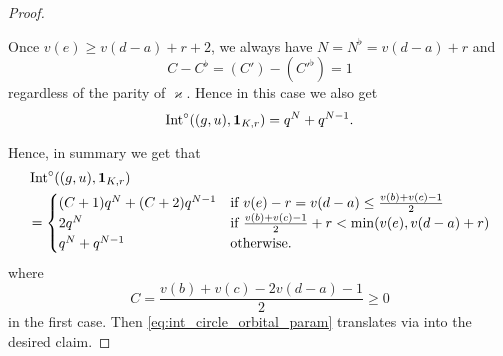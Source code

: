 \begin{proof}
\begin{itemize}
\begin{itemize}
      \ii Once $v(e) \ge v(d-a) + r + 2$,
      we always have $N = N^\flat = v(d-a) + r$ and
      \[ C - C^\flat = (C') - (C'^\flat) = 1 \]
      regardless of the parity of $\varkappa$.
      Hence in this case we also get
      \[ \operatorname{Int}^\circ((g,u), \mathbf{1}_{K, r}) = q^{N} + q^{N-1}. \]
    \end{itemize}
  \end{itemize}
  Hence, in summary we get that
  \begin{equation}
  \begin{aligned}
    &\operatorname{Int}^\circ((g,u), \mathbf{1}_{K, r}) \\
    &= \begin{cases}
      (C+1) q^{N} + (C+2) q^{N-1}
        & \text{if } v(e)-r = v(d-a) \le \frac{v(b)+v(c)-1}{2} \\
      2q^N & \text{if } \frac{v(b)+v(c)-1}{2} + r < \min(v(e), v(d-a)+r) \\
      q^N + q^{N-1} & \text{otherwise}.
    \end{cases}
  \end{aligned}
  \label{eq:int_circle_orbital_param}
  \end{equation}
  where
  \[ C = \frac{v(b) + v(c)- 2v(d-a) - 1}{2} \ge 0 \]
  in the first case.
  Then \eqref{eq:int_circle_orbital_param} translates via
   into the desired claim.
\end{proof}
